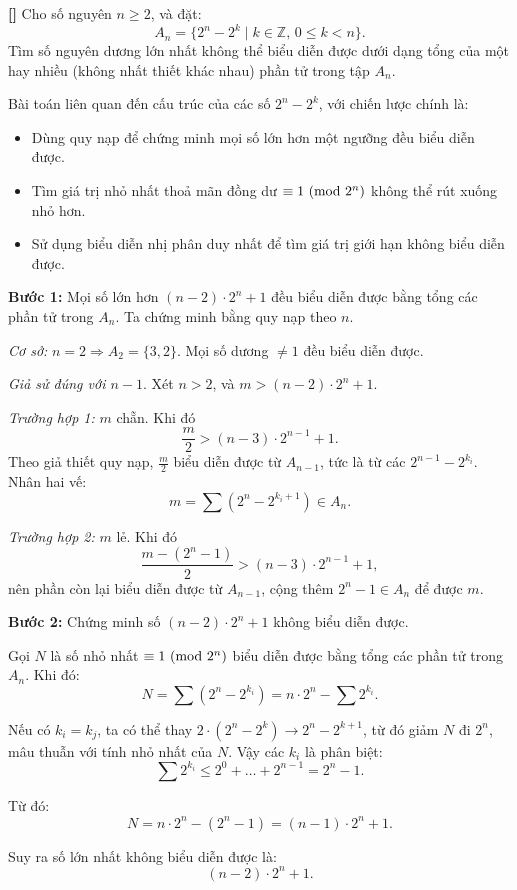 \documentclass[../01-divisibility.tex]{subfiles}
\begin{document}
\begin{example*}\label{example:IND-2015-TST2-P1}\textbf{[]}\footnotemark
	Cho số nguyên \( n \geq 2 \), và đặt:
	\[
		A_n = \{2^n - 2^k \mid k \in \mathbb{Z},\, 0 \leq k < n \}.
	\]
	Tìm số nguyên dương lớn nhất không thể biểu diễn được dưới dạng tổng của một hay nhiều (không nhất thiết khác nhau) phần tử trong tập \( A_n \).
\end{example*}

\begin{story*}
	Bài toán liên quan đến cấu trúc của các số \( 2^n - 2^k \), với chiến lược chính là:
	\begin{itemize}[topsep=0pt, itemsep=0pt]
	    \item Dùng quy nạp để chứng minh mọi số lớn hơn một ngưỡng đều biểu diễn được.
	    \item Tìm giá trị nhỏ nhất thoả mãn đồng dư \( \equiv 1 \ (\mathrm{mod}\ 2^n) \) không thể rút xuống nhỏ hơn.
	    \item Sử dụng biểu diễn nhị phân duy nhất để tìm giá trị giới hạn không biểu diễn được.
	\end{itemize}
\end{story*}

\begin{soln}
	\textbf{Bước 1:} Mọi số lớn hơn \( (n - 2) \cdot 2^n + 1 \) đều biểu diễn được bằng tổng các phần tử trong \( A_n \). Ta chứng minh bằng quy nạp theo \( n \).

	\textit{Cơ sở:} \( n = 2 \Rightarrow A_2 = \{3, 2\} \). Mọi số dương \( \ne 1 \) đều biểu diễn được.

	\textit{Giả sử đúng với \( n - 1 \)}. Xét \( n > 2 \), và \( m > (n - 2) \cdot 2^n + 1 \).

	\textit{Trường hợp 1:} \( m \) chẵn. Khi đó
	\[
		\frac{m}{2} > (n - 3) \cdot 2^{n-1} + 1.
	\]
	Theo giả thiết quy nạp, \( \frac{m}{2} \) biểu diễn được từ \( A_{n-1} \), tức là từ các \( 2^{n-1} - 2^{k_i} \). Nhân hai vế:
	\[
		m = \sum (2^n - 2^{k_i + 1}) \in A_n.
	\]

	\textit{Trường hợp 2:} \( m \) lẻ. Khi đó
	\[
		\frac{m - (2^n - 1)}{2} > (n - 3) \cdot 2^{n-1} + 1,
	\]
	nên phần còn lại biểu diễn được từ \( A_{n-1} \), cộng thêm \( 2^n - 1 \in A_n \) để được \( m \).

	\textbf{Bước 2:} Chứng minh số \( (n - 2) \cdot 2^n + 1 \) không biểu diễn được.

	Gọi \( N \) là số nhỏ nhất \( \equiv 1 \ (\mathrm{mod}\ 2^n) \) biểu diễn được bằng tổng các phần tử trong \( A_n \). Khi đó:
	\[
		N = \sum (2^n - 2^{k_i}) = n \cdot 2^n - \sum 2^{k_i}.
	\]

	Nếu có \( k_i = k_j \), ta có thể thay \( 2 \cdot (2^n - 2^k) \to 2^n - 2^{k+1} \), từ đó giảm \( N \) đi \( 2^n \), mâu thuẫn với tính nhỏ nhất của \( N \). Vậy các \( k_i \) là phân biệt:
	\[
		\sum 2^{k_i} \le 2^0 + \dots + 2^{n-1} = 2^n - 1.
	\]

	Từ đó:
	\[
		N = n \cdot 2^n - (2^n - 1) = (n - 1) \cdot 2^n + 1.
	\]

	Suy ra số lớn nhất không biểu diễn được là:
	\[
		(n - 2) \cdot 2^n + 1.
	\]
\end{soln}

\end{document}
